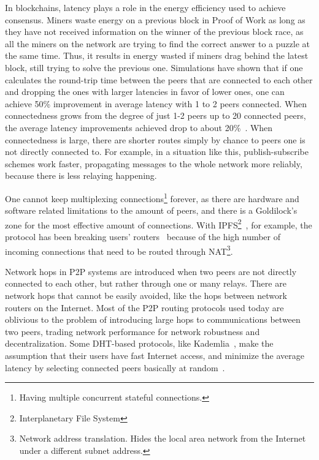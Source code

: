 In blockchains, latency plays a role in the energy efficiency used to achieve consensus. Miners waste energy on a previous block in Proof of Work as long as they have not received information on the winner of the previous block race, as all the miners on the network are trying to find the correct answer to a puzzle at the same time. Thus, it results in energy wasted if miners drag behind the latest block, still trying to solve the previous one. Simulations have shown that if one calculates the round-trip time between the peers that are connected to each other and dropping the ones with larger latencies in favor of lower ones, one can achieve 50\% improvement in average latency with 1 to 2 peers connected. When connectedness grows from the degree of just 1-2 peers up to 20 connected peers, the average latency improvements achieved drop to about 20\%~\cite{Bi_undated-is}. When connectedness is large, there are shorter routes simply by chance to peers one is not directly connected to. For example, in a situation like this, publish-subscribe schemes work faster, propagating messages to the whole network more reliably, because there is less relaying happening.

One cannot keep multiplexing connections\footnote{Having multiple concurrent stateful connections.} forever, as there are hardware and software related limitations to the amount of peers, and there is a Goldilock's zone for the most effective amount of connections. With IPFS\footnote{Interplanetary File System}~\cite{Labs_undated-uw}, for example, the protocol has been breaking users' routers~\cite{Whyrusleeping2016-ej} because of the high number of incoming connections that need to be routed through NAT\footnote{Network address translation. Hides the local area network from the Internet under a different subnet address.}.

Network hops in P2P systems are introduced when two peers are not directly connected to each other, but rather through one or many relays. There are network hops that cannot be easily avoided, like the hops between network routers on the Internet. Most of the P2P routing protocols used today are oblivious to the problem of introducing large hops to communications between two peers, trading network performance for network robustness and decentralization. Some DHT-based protocols, like Kademlia~\cite{Petar_Maymounkov2020-sx}, make the assumption that their users have fast Internet access, and minimize the average latency by selecting connected peers basically at random~\cite{Eigenmann2020-zm}.

